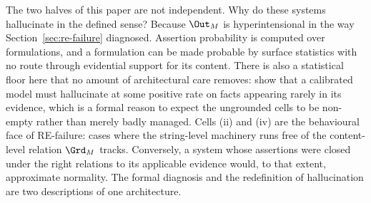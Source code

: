 The two halves of this paper are not independent. Why do these systems
hallucinate in the defined sense? Because $\Out_M$ is hyperintensional in the way
Section~\ref{sec:re-failure} diagnosed. Assertion probability is computed over
formulations, and a formulation can be made probable by surface statistics with
no route through evidential support for its content. There is also a statistical floor here that no amount of architectural
care removes: \citet{kalai2024} show that a calibrated model must hallucinate at
some positive rate on facts appearing rarely in its evidence, which is a formal
reason to expect the ungrounded cells to be non-empty rather than merely badly
managed. Cells (ii) and (iv) are the
behavioural face of RE-failure: cases where the string-level machinery runs free
of the content-level relation $\Grd_M$ tracks. Conversely, a system whose
assertions were closed under the right relations to its applicable evidence
would, to that extent, approximate normality. The formal diagnosis and the
redefinition of hallucination are two descriptions of one architecture.
